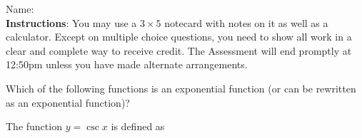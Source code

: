 \documentclass[addpoints]{exam}
\begin{document}
		
\vspace*{0pt}

\noindent
Name: \underline{\hspace{2in}} \\


\noindent
\textbf{Instructions}:  You may use a $3 \times 5$ notecard with notes on it as well as a calculator. Except on multiple choice questions, you need to show all work in a clear and complete way to receive credit. The Assessment will end promptly at 12:50pm unless you have made alternate arrangements. 

\begin{questions}


\question[2] Which of the following functions is an exponential function (or can be rewritten as an exponential function)? 

\question[2] The function $y = \csc x$ is defined as 
\end{questions}
\end{document}
